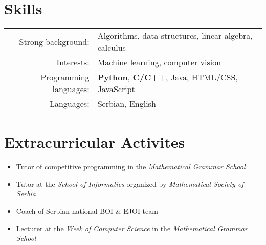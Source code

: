 \documentclass[a4paper,10pt]{article}
\begin{document}
\section{Skills}
\begin{tabular}{rl}
 Strong background:& Algorithms, data structures, linear algebra, calculus\\
 Interests:& Machine learning, computer vision\\
 Programming languages:& \textbf{Python}, \textbf{C/C++}, Java, HTML/CSS, JavaScript\\
 Languages:& Serbian, English
\end{tabular}

\section{Extracurricular Activites}
    \begin{itemize}
        \item Tutor of competitive programming in the \emph{Mathematical Grammar School}
        \item Tutor at the \emph{School of Informatics} organized by \emph{Mathematical Society of Serbia}
        \item Coach of Serbian national BOI \& EJOI team
        \item Lecturer at the \emph{Week of Computer Science} in the \emph{Mathematical Grammar School}
    \end{itemize}
\end{document}
